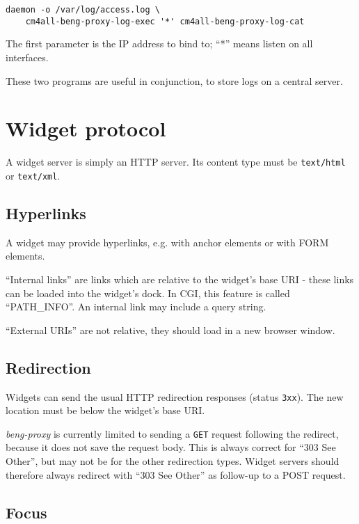\documentclass[a4paper,12pt]{article}
\begin{document}
\begin{verbatim}
daemon -o /var/log/access.log \
    cm4all-beng-proxy-log-exec '*' cm4all-beng-proxy-log-cat
\end{verbatim}

The first parameter is the IP address to bind to; ``*'' means listen
on all interfaces.

These two programs are useful in conjunction, to store logs on a
central server.


\section{Widget protocol}

A widget server is simply an HTTP server.  Its content type must be
\texttt{text/html} or \texttt{text/xml}.


\subsection{Hyperlinks}

A widget may provide hyperlinks, e.g. with anchor elements or with
FORM elements.

``Internal links'' are links which are relative to the widget's base
URI - these links can be loaded into the widget's dock.  In CGI, this
feature is called ``PATH\_INFO''.  An internal link may include a
query string.

``External URIs'' are not relative, they should
load in a new browser window.

\subsection{Redirection}

Widgets can send the usual HTTP redirection responses (status
\texttt{3xx}).  The new location must be below the widget's base URI.

\emph{beng-proxy} is currently limited to sending a \texttt{GET}
request following the redirect, because it does not save the request
body.  This is always correct for ``303 See Other'', but may not be
for the other redirection types.  Widget servers should therefore
always redirect with ``303 See Other'' as follow-up to a POST request.

\subsection{Focus}
\label{focus}
\end{document}

